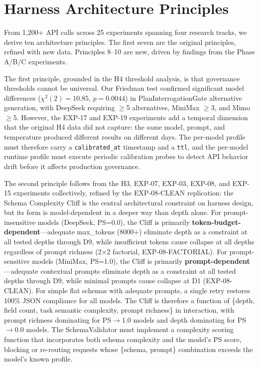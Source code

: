 \documentclass[11pt,a4paper]{article}
\begin{document}
\section{Harness Architecture Principles}

From 1,200+ API calls across 25 experiments spanning four research tracks, we derive ten architecture principles. The first seven are the original principles, refined with new data. Principles 8--10 are new, driven by findings from the Phase A/B/C experiments.

The first principle, grounded in the H4 threshold analysis, is that governance thresholds cannot be universal. Our Friedman test confirmed significant model differences ($\chi^2(2)=10.85$, $p=0.0044$) in PlanInterrogationGate alternative generation, with DeepSeek requiring $\geq$5 alternatives, MiniMax $\geq$3, and Mimo $\geq$5. However, the EXP-17 and EXP-19 experiments add a temporal dimension that the original H4 data did not capture: the same model, prompt, and temperature produced different results on different days. The per-model profile must therefore carry a \texttt{calibrated\_at} timestamp and a \texttt{ttl}, and the per-model runtime profile must execute periodic calibration probes to detect API behavior drift before it affects production governance.

The second principle follows from the H3, EXP-07, EXP-03, EXP-08, and EXP-15 experiments collectively, refined by the EXP-08-CLEAN replication: the Schema Complexity Cliff is the central architectural constraint on harness design, but its form is model-dependent in a deeper way than depth alone. For prompt-insensitive models (DeepSeek, PS=0.0), the Cliff is primarily \textbf{token-budget-dependent}---adequate max\_tokens (8000+) eliminate depth as a constraint at all tested depths through D9, while insufficient tokens cause collapse at all depths regardless of prompt richness (2$\times$2 factorial, EXP-08-FACTORIAL). For prompt-sensitive models (MiniMax, PS=1.0), the Cliff is primarily \textbf{prompt-dependent}---adequate contextual prompts eliminate depth as a constraint at all tested depths through D9, while minimal prompts cause collapse at D1 (EXP-08-CLEAN). For simple flat schemas with adequate prompts, a single retry restores 100\% JSON compliance for all models. The Cliff is therefore a function of \{depth, field count, task semantic complexity, prompt richness\} in interaction, with prompt richness dominating for PS$\rightarrow$1.0 models and depth dominating for PS$\rightarrow$0.0 models. The SchemaValidator must implement a complexity scoring function that incorporates both schema complexity and the model's PS score, blocking or re-routing requests whose \{schema, prompt\} combination exceeds the model's known profile.
\end{document}
